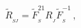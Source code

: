 \begin{equation}\label{boro32}
\tilde R_{_{\!SJ}}^{}=\tilde{F}^{21}_{_{\!S}}
R_{_{\!J}}^{}\tilde{F}^{-1}_{_{\!S}}\,,
\end{equation}


